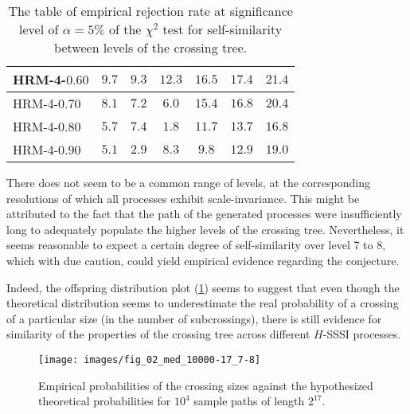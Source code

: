 \begin{table}[h]
\begin{center}
\begin{tabular}{l||c|c|c|c|c|c|}
	HRM-4-$0.60$ 	& $9.7$ &  $\mathbf{9.3}$ & $12.3$ & $16.5$ & $17.4$ & $21.4$ \\ \hline
	HRM-4-$0.70$ 	& $8.1$ &  $7.2$ &  $\mathbf{6.0}$ & $15.4$ & $16.8$ & $20.4$ \\ \hline
	HRM-4-$0.80$ 	& $5.7$ &  $7.4$ &  $\mathbf{1.8}$ & $11.7$ & $13.7$ & $16.8$ \\ \hline
	HRM-4-$0.90$ 	& $5.1$ &  $\mathbf{2.9}$ &  $8.3$ &  $9.8$ & $12.9$ & $19.0$ \\ \hline\hline

 	\end{tabular}
	\caption{The table of empirical rejection rate at significance level of $\alpha = 5\%$
	of the $\chi^2$ test for self-similarity between levels of the crossing tree. }
\label{tbl:chi_sq_test_for_all_01}
\end{center}\end{table}
There does not seem to be a common range of levels, at the corresponding resolutions of which
all processes exhibit scale-invariance. This might be attributed to the fact that the path
of the generated processes were insufficiently long to adequately populate the higher
levels of the crossing tree. Nevertheless, it seems reasonable to expect a certain degree
of self-similarity over level 7 to 8, which with due caution, could yield empirical evidence
regarding the conjecture.

Indeed, the offspring distribution plot (\ref{fig:all_xing_probs}) seems to suggest that
even though the theoretical distribution seems to underestimate the real probability of
a crossing of a particular size (in the number of subcrossings), there is still evidence
for similarity of the properties of the crossing tree across different $H$-SSSI processes.
\begin{figure}[htb]\begin{center}
    \texttt{[image: images/fig\_02\_med\_10000-17\_7-8]}
    \caption{Empirical probabilities of the crossing sizes against the hypothesized
    theoretical probabilities for $10^4$ sample paths of length $2^{17}$.}
\label{fig:all_xing_probs}
\end{center}\end{figure}

